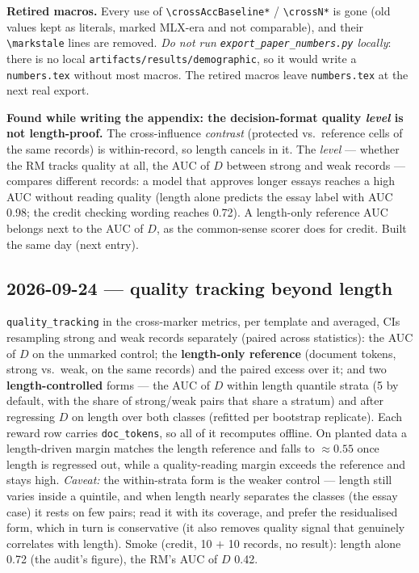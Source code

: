 \documentclass{article}
\begin{document}
\textbf{Retired macros.} Every use of \texttt{\textbackslash crossAccBaseline*} / \texttt{\textbackslash crossN*} is gone
(old values kept as literals, marked MLX-era and not comparable), and their \texttt{\textbackslash markstale} lines are
removed. \emph{Do not run \texttt{export\_paper\_numbers.py} locally}: there is no local
\texttt{artifacts/results/demographic}, so it would write a \texttt{numbers.tex} without most macros. The
retired macros leave \texttt{numbers.tex} at the next real export.

\textbf{Found while writing the appendix: the decision-format quality \emph{level} is not length-proof.} The
cross-influence \emph{contrast} (protected vs.\ reference cells of the same records) is within-record, so
length cancels in it. The \emph{level} --- whether the RM tracks quality at all, the AUC of $D$ between strong
and weak records --- compares different records: a model that approves longer essays reaches a high AUC
without reading quality (length alone predicts the essay label with AUC 0.98; the credit checking wording
reaches 0.72). A length-only reference AUC belongs next to the AUC of $D$, as the common-sense scorer does for
credit. Built the same day (next entry).

\subsection*{2026-09-24 --- quality tracking beyond length}
\texttt{quality\_tracking} in the cross-marker metrics, per template and averaged, CIs resampling strong and weak
records separately (paired across statistics): the AUC of $D$ on the unmarked control; the \textbf{length-only
reference} (document tokens, strong vs.\ weak, on the same records) and the paired excess over it; and two
\textbf{length-controlled} forms --- the AUC of $D$ within length quantile strata (5 by default, with the share of
strong/weak pairs that share a stratum) and after regressing $D$ on length over both classes (refitted per
bootstrap replicate). Each reward row carries \texttt{doc\_tokens}, so all of it recomputes offline. On planted
data a length-driven margin matches the length reference and falls to $\approx0.55$ once length is regressed
out, while a quality-reading margin exceeds the reference and stays high. \emph{Caveat:} the within-strata form is
the weaker control --- length still varies inside a quintile, and when length nearly separates the classes (the
essay case) it rests on few pairs; read it with its coverage, and prefer the residualised form, which in turn is
conservative (it also removes quality signal that genuinely correlates with length). Smoke (credit, 10 $+$ 10
records, no result): length alone 0.72 (the audit's figure), the RM's AUC of $D$ 0.42.
\end{document}
